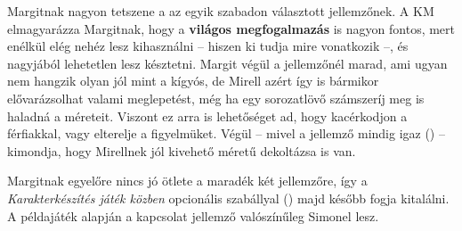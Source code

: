 Margitnak nagyon tetszene a  az egyik szabadon választott jellemzőnek. A KM elmagyarázza Margitnak, hogy a \textbf{világos megfogalmazás} is nagyon fontos, mert enélkül elég nehéz lesz kihasználni -- hiszen ki tudja mire vonatkozik --, és nagyjából lehetetlen lesz késztetni. Margit végül a  jellemzőnél marad, ami ugyan nem hangzik olyan jól mint a kígyós, de Mirell azért így is bármikor elővarázsolhat valami meglepetést, még ha egy sorozatlövő számszeríj meg is haladná a méreteit. Viszont ez arra is lehetőséget ad, hogy kacérkodjon a férfiakkal, vagy elterelje a figyelmüket. Végül -- mivel a jellemző mindig igaz () -- kimondja, hogy Mirellnek jól kivehető méretű dekoltázsa is van.

Margitnak egyelőre nincs jó ötlete a maradék két jellemzőre, így a \emph{Karakterkészítés játék közben} opcionális szabállyal () majd később fogja kitalálni. A példajáték  alapján a kapcsolat jellemző valószínűleg Simonel lesz.
